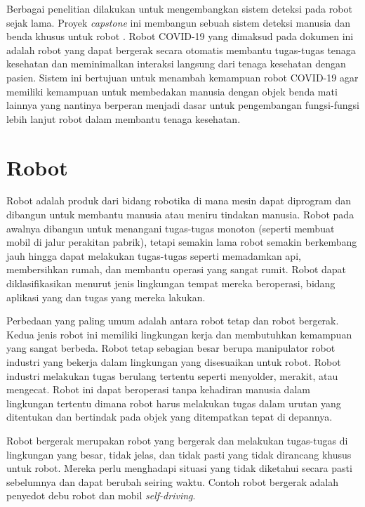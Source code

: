 
Berbagai penelitian dilakukan untuk mengembangkan sistem deteksi pada robot sejak lama. Proyek \textit{capstone} ini membangun sebuah sistem deteksi manusia dan benda khusus  untuk robot \covid. Robot COVID-19 yang dimaksud pada dokumen ini adalah robot yang dapat bergerak secara otomatis membantu tugas-tugas tenaga kesehatan dan meminimalkan interaksi langsung dari tenaga kesehatan dengan pasien. Sistem ini bertujuan untuk menambah kemampuan robot COVID-19 agar memiliki kemampuan untuk membedakan manusia dengan objek benda mati lainnya yang nantinya berperan menjadi dasar untuk pengembangan fungsi-fungsi lebih lanjut robot dalam membantu tenaga kesehatan.

\section{Robot}
\label{sec:Robot_}

Robot adalah produk dari bidang robotika di mana mesin dapat diprogram dan dibangun untuk membantu manusia atau meniru tindakan manusia. Robot pada awalnya dibangun untuk menangani tugas-tugas monoton (seperti membuat mobil di jalur perakitan pabrik), tetapi semakin lama robot semakin berkembang jauh hingga dapat melakukan tugas-tugas seperti memadamkan api, membersihkan rumah, dan membantu operasi yang sangat rumit. Robot dapat diklasifikasikan menurut jenis lingkungan tempat mereka beroperasi, bidang aplikasi yang dan tugas yang mereka lakukan.

Perbedaan yang paling umum adalah antara robot tetap dan robot bergerak. Kedua jenis robot ini memiliki lingkungan kerja dan membutuhkan kemampuan yang sangat berbeda. Robot tetap sebagian besar berupa manipulator robot industri yang bekerja dalam lingkungan yang disesuaikan untuk robot. Robot industri melakukan tugas berulang tertentu seperti menyolder, merakit, atau mengecat.  Robot ini dapat beroperasi tanpa kehadiran manusia dalam lingkungan tertentu dimana robot harus melakukan tugas dalam
urutan yang ditentukan dan bertindak pada objek yang ditempatkan tepat di depannya.

Robot bergerak merupakan robot yang bergerak dan melakukan tugas-tugas di lingkungan yang besar, tidak jelas, dan tidak pasti yang tidak dirancang khusus untuk robot. Mereka perlu menghadapi situasi yang tidak diketahui secara pasti sebelumnya dan dapat berubah seiring waktu. Contoh robot bergerak adalah penyedot debu robot dan mobil \textit{self-driving}.

